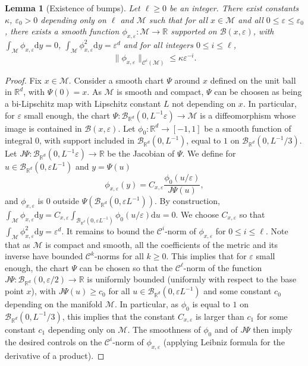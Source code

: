\documentclass[10pt,a4paper]{article}
\newcommand{\R}{{\mathbb R}}
\newcommand\cB{\mathcal{B}}
\newcommand\cC{\mathcal{C}}
\newcommand\cM{\mathcal{M}}
\newcommand\dR{\mathbb{R}}
\newcommand\dd{\mathrm{d}}
\newcommand{\eps}{{\varepsilon}}
\newtheorem{lemma}[theorem]{Lemma}
\begin{document}
\begin{lemma}[Existence of bumps]\label{lem:construction_bump}
Let $\ell\ge 0$ be an integer. There exist constants $\kappa$, $\eps_0>0$ depending only on $\ell$ and $\cM$ such that
    for all $x\in \cM$ and all $0\le \eps \le \eps_0$, there exists a smooth function $\phi_{x,\eps}:\cM\to \R$ supported on $\cB(x,\eps)$, with $\int_\cM \phi_{x,\eps} \dd y=0$, $\int_{\cM}\phi_{x,\eps}^2 \dd y = \eps^d $ and for all integers $0\le i\le \ell$,
    \begin{equation}
        \|\phi_{x,\eps}\|_{\cC^i(\cM)}\le \kappa\eps^{-i}.
    \end{equation}
\end{lemma}
\begin{proof}
    {Fix $x\in \cM$. Consider a smooth chart $\Psi$ around $x$ defined on the unit ball in $\R^d$, with $\Psi(0)=x$. As $\cM$ is smooth and compact, $\Psi$ can be choosen as being a bi-Lipschitz map with Lipschitz constant $L$ not depending on $x$. In particular, for $\eps$ small enough, the chart $\Psi:\cB_{\dR^d}(0,L^{-1}\eps)\to \cM$ is a diffeomorphism whose image is contained in $\cB(x,\eps)$. Let $\phi_0:\R^d\to [-1,1]$ be a smooth function of integral $0$, with support included in $\cB_{\dR^d}(0,L^{-1})$, equal to $1$ on $\cB_{\dR^d}(0,L^{-1}/3)$. Let $J\Psi:\cB_{\dR^d}(0,L^{-1}\eps)\to \R$ be the Jacobian of $\Psi$. We define for $u \in \cB_{\dR^d}(0,\eps L^{-1})$ and $y=\Psi(u)$
    \[ \phi_{x,\eps}(y)= C_{x,\eps}\frac{\phi_0(u/\eps)}{J\Psi(u)}, \]
    and $\phi_{x,\eps}$ is $0$ outside $\Psi(\cB_{\dR^d}(0,\eps L^{-1}))$. By construction, $\int_{\cM}\phi_{x,\eps} \dd y = C_{x,\eps} \int_{\cB_{\dR^d}(0,\eps L^{-1})} \phi_0(u/\eps)\dd u=0$. We choose $C_{x,\eps}$ so that $\int_{\cM}\phi_{x,\eps}^2 \dd y=\eps^d$. It remains to bound the $\cC^i$-norm of $\phi_{x,\eps}$ for $0\le i\le \ell$.  Note that as $\cM$ is compact and smooth, all the coefficients of the metric and its inverse have bounded $\cC^k$-norms for all $k\ge 0$. This implies that for $\eps$ small enough, the chart $\Psi$ can be chosen so that the $\cC^{\ell}$-norm of the function $J\Psi: \cB_{\dR^d}(0,\eps/2)\to \R$ is uniformly bounded (uniformly with respect to the base point $x$), with $J\Psi(u)\ge c_0$ for all $u\in \cB_{\dR^d}(0,\eps L^{-1})$ and some constant $c_0$ depending on the manifold $\cM$. In particular, as $\phi_0$ is equal to $1$ on $\cB_{\dR^d}(0,L^{-1}/3)$, this implies that the constant $C_{x,\eps}$ is larger than $c_1$ for some constant $c_1$ depending only on $\cM$. }The smoothness of $\phi_0$ and of $J\Psi$ then imply the desired controls on the $\cC^i$-norm of $\phi_{x,\eps}$ (applying Leibniz formula for the derivative of a product).
\end{proof}
\end{document}
